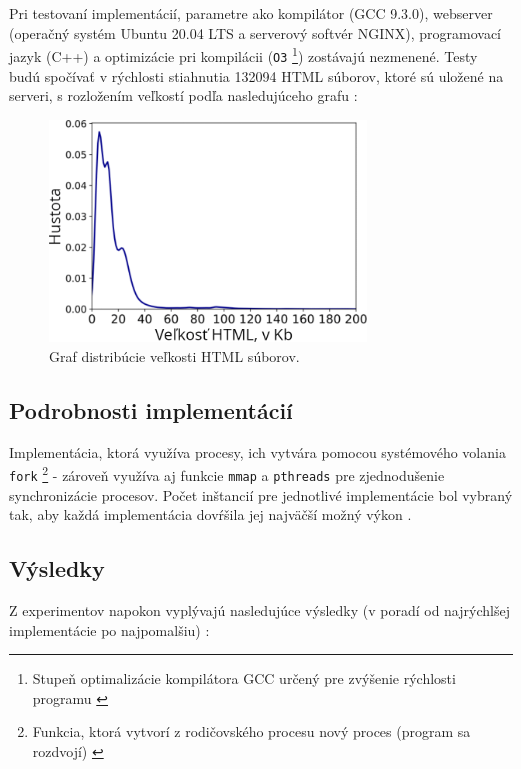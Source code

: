 \documentclass[10pt,twoside,slovak,a4paper]{article}
\begin{document}
Pri testovaní implementácií, parametre ako kompilátor (GCC 9.3.0), webserver (operačný systém Ubuntu 20.04 LTS a serverový softvér NGINX), programovací jazyk (C++) a optimizácie pri kompilácii (\texttt{O3} \footnote{Stupeň optimalizácie kompilátora GCC určený pre zvýšenie rýchlosti programu \cite{stallman2009using}}) zostávajú nezmenené. Testy budú spočívať v rýchlosti stiahnutia 132094 HTML súborov, ktoré sú uložené na serveri, s rozložením veľkostí podľa nasledujúceho grafu \cite{9648837}:

\begin{figure}
    \centering
    \includegraphics[width=0.75\textwidth]{dataset.png}
    \caption{Graf distribúcie veľkosti HTML súborov. \cite{9648837}}
\end{figure}

\subsection{Podrobnosti implementácií}

Implementácia, ktorá využíva procesy, ich vytvára pomocou systémového volania \texttt{fork} \footnote{Funkcia, ktorá vytvorí z rodičovského procesu nový proces (program sa rozdvojí) \cite{kerrisk2010linux}} - zároveň využíva aj funkcie \texttt{mmap} a \texttt{pthreads} pre zjednodušenie synchronizácie procesov. Počet inštancií pre jednotlivé implementácie bol vybraný tak, aby každá implementácia dovŕšila jej najväčší možný výkon \cite{9648837}.

\subsection{Výsledky}

Z experimentov napokon vyplývajú nasledujúce výsledky (v poradí od najrýchlšej implementácie po najpomalšiu) \cite{9648837}:
\end{document}
